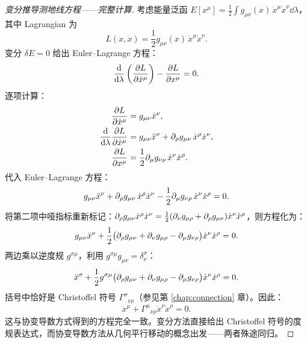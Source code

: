 \begin{proof}[变分推导测地线方程——完整计算]
考虑能量泛函 $E[x^\mu] = \frac{1}{2} \int g_{\mu\nu}(x) \, \dot x^\mu \dot x^\nu \dd\lambda$，其中 Lagrangian 为
\begin{equation}
    L(x, \dot x) = \frac{1}{2} g_{\mu\nu}(x) \, \dot x^\mu \dot x^\nu.
\end{equation}
变分 $\delta E = 0$ 给出 Euler--Lagrange 方程：
\begin{equation}
    \frac{\dd}{\dd\lambda} \left( \frac{\partial L}{\partial \dot x^\mu} \right) - \frac{\partial L}{\partial x^\mu} = 0.
\end{equation}
逐项计算：
\begin{align}
    \frac{\partial L}{\partial \dot x^\mu} &= g_{\mu\nu} \dot x^\nu, \\
    \frac{\dd}{\dd\lambda} \frac{\partial L}{\partial \dot x^\mu} &= g_{\mu\nu} \ddot x^\nu + \partial_\rho g_{\mu\nu} \, \dot x^\rho \dot x^\nu, \\
    \frac{\partial L}{\partial x^\mu} &= \frac{1}{2} \partial_\mu g_{\nu\rho} \, \dot x^\nu \dot x^\rho.
\end{align}
代入 Euler--Lagrange 方程：
\begin{equation}
    g_{\mu\nu} \ddot x^\nu + \partial_\rho g_{\mu\nu} \, \dot x^\rho \dot x^\nu - \frac{1}{2} \partial_\mu g_{\nu\rho} \, \dot x^\nu \dot x^\rho = 0.
\end{equation}
将第二项中哑指标重新标记：$\partial_\rho g_{\mu\nu} \dot x^\rho \dot x^\nu = \frac{1}{2}(\partial_\nu g_{\mu\rho} + \partial_\rho g_{\mu\nu}) \dot x^\nu \dot x^\rho$，则方程化为：
\begin{equation}
    g_{\mu\nu} \ddot x^\nu + \frac{1}{2}\bigl(\partial_\rho g_{\mu\nu} + \partial_\nu g_{\mu\rho} - \partial_\mu g_{\nu\rho}\bigr) \dot x^\nu \dot x^\rho = 0.
\end{equation}
两边乘以逆度规 $g^{\sigma\mu}$，利用 $g^{\sigma\mu} g_{\mu\nu} = \delta^\sigma_\nu$：
\begin{equation}
    \ddot x^\sigma + \frac{1}{2} g^{\sigma\mu}\bigl(\partial_\rho g_{\mu\nu} + \partial_\nu g_{\mu\rho} - \partial_\mu g_{\nu\rho}\bigr) \dot x^\nu \dot x^\rho = 0.
\end{equation}
括号中恰好是 Christoffel 符号 $\Gamma^\sigma{}_{\nu\rho}$（参见第 \ref{chap:connection} 章）。因此：
\begin{equation}
    \boxed{\ddot x^\mu + \Gamma^\mu{}_{\nu\rho} \dot x^\nu \dot x^\rho = 0}.
\end{equation}
这与协变导数方式得到的方程完全一致。变分方法直接给出 Christoffel 符号的度规表达式，而协变导数方法从几何平行移动的概念出发——两者殊途同归。
\end{proof}

